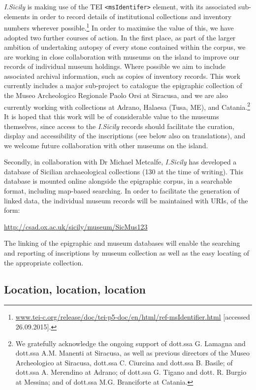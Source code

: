 \documentclass[amsthm,ebook]{saparticle}
\begin{document}
\emph{I.Sicily} is making use of the TEI \texttt{{\textless}msIdentifer{\textgreater}} element, with its associated sub-elements in
order to record details of institutional collections and inventory numbers wherever possible.\footnote{\url{www.tei-c.org/release/doc/tei-p5-doc/en/html/ref-msIdentifier.html} [accessed 26.09.2015].} In order to maximise the
value of this, we have adopted two further courses of action. In the first place, as part of the larger ambition of
undertaking autopsy of every stone contained within the corpus, we are working in close collaboration with museums on
the island to improve our records of individual museum holdings. Where possible we aim to include associated archival
information, such as copies of inventory records. This work currently includes a major sub-project to catalogue the
epigraphic collection of the Museo Archeologico Regionale Paolo Orsi at Siracusa, and we are also currently working
with collections at Adrano, Halaesa (Tusa, ME), and Catania.\footnote{ We gratefully acknowledge the ongoing support of
dott.ssa G. Lamagna and dott.ssa A.M. Manenti at Siracusa, as well as previous directors of the Museo Archeologico at
Siracusa, dott.ssa C. Ciurcina and dott.ssa B. Basile; of dott.ssa A. Merendino at Adrano; of dott.ssa G. Tigano and
dott. R. Burgio at Messina; and of dott.ssa M.G. Branciforte at Catania.} It is hoped that this work will be of
considerable value to the museums themselves, since access to the \emph{I.Sicily} records should facilitate the curation,
display and accessibility of the inscriptions (see below also on translations), and we welcome future collaboration
with other museums on the island.

Secondly, in collaboration with Dr Michael Metcalfe, \emph{I.Sicily} has developed a database of Sicilian archaeological
collections (130 at the time of writing). This database is mounted online alongside the epigraphic corpus, in a
searchable format, including map-based searching. In order to facilitate the generation of linked data, the individual
museum records will be maintained with URIs, of the form:

\url{http://csad.ox.ac.uk/sicily/museum/SicMus123}

The linking of the epigraphic and museum databases will enable the searching and reporting of inscriptions by museum
collection as well as the easy locating of the appropriate collection.




\subsection{Location, location, location}
\end{document}
